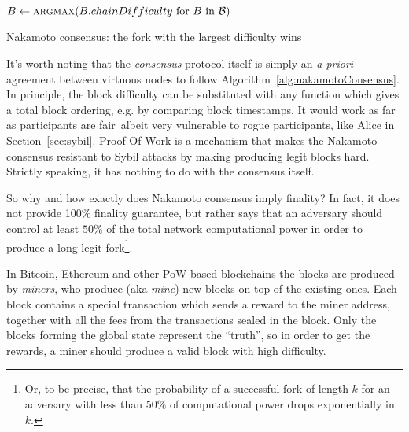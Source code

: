 \documentclass[a4paper]{article}
\begin{document}
\begin{algorithm}
\begin{algorithmic}[1] 
  \State $B \gets \Call{argmax}{B.chainDifficulty\text{ for $B$ in $\mathcal{B}$}}$
  \State \Return  {} 
\EndFunction

\end{algorithmic}
\caption{Nakamoto consensus: the fork with the largest difficulty wins}
\label{alg:nakamotoConsensus}
\end{algorithm}

It's worth noting that the \emph{consensus} protocol itself is simply an \emph{a priori} agreement between virtuous nodes to follow Algorithm~\ref{alg:nakamotoConsensus}. In principle, the block difficulty can be substituted with any function which gives a total block ordering, e.g. by comparing block timestamps. It would work as far as participants are fair\, albeit very vulnerable to rogue participants, like Alice in Section~\ref{sec:sybil}.
Proof-Of-Work is a mechanism that makes the Nakamoto consensus resistant to Sybil attacks by making producing legit blocks hard. Strictly speaking, it has nothing to do with the consensus itself.

So why and how exactly does Nakamoto consensus imply finality? 
In fact, it does not provide 100\% finality guarantee, but rather says that an adversary should control at least $50\%$ of the total network computational power in order to produce a long legit fork\footnote{Or, to be precise, that the probability of a successful fork of length $k$ for an adversary with less than $50\%$ of computational power drops exponentially in $k$. }. 

In Bitcoin, Ethereum and other PoW-based blockchains the blocks are produced by \emph{miners}, who produce (aka \emph{mine}) new blocks on top of the existing ones. Each block contains a special transaction which sends a reward to the miner address, together with all the fees from the transactions sealed in the block. Only the blocks forming the global state represent the ``truth'', so in order to get the rewards, a miner should produce a valid block with high difficulty.
\end{document}
